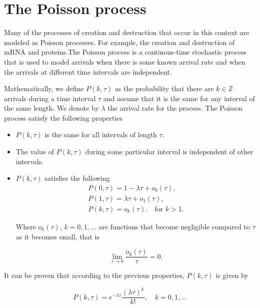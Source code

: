 \section{The Poisson process}

Many of the processes of creation and destruction that occur in this context are modeled as Poisson processes. For example, the creation and destruction of mRNA and proteins.The Poisson process is a continous-time stochastic process that is used to model arrivals when there is some known arrival rate and when the arrivals at different time intervals are independent.

Mathematically, we define $P(k,\tau)$ as the probability that there are $k\in\mathbb{Z}$ arrivals during a time interval $\tau$ and assume that it is the same for any interval of the same length. We denote by $\lambda$ the arrival rate for the process. The Poisson process satisfy the following properties

\begin{itemize}
  \item  $P(k,\tau)$ is the same for all intervals of length $\tau$.
  \item  The value of $P(k,\tau)$ during some particular interval is independent of other intervals.
  \item $P(k,\tau)$ satisfies the following
    \begin{equation*}
      \begin{split}
        P(0,\tau)=1-\lambda\tau+o_0(\tau),\\
        P(1,\tau)=\lambda\tau+o_1(\tau),\\
        P(k,\tau)=o_k(\tau).\quad\text{for } k>1.
      \end{split}
    \end{equation*}
    
    Where $o_k(\tau)$, $k=0,1,\dotsc$ are functions that become negligible compared to $\tau$ as it becomes small, that is

    \begin{equation*}
      \lim_{\tau\to 0}\frac{o_k(\tau)}{\tau}=0.
    \end{equation*}
\end{itemize}

It can be proven that according to the previous properties, $P(k,\tau)$ is given by 

\begin{equation*}
  P(k,\tau) = e^{-\lambda\tau}\frac{(\lambda\tau)^k}{k!},\quad k=0,1,\dotsc
\end{equation*}

